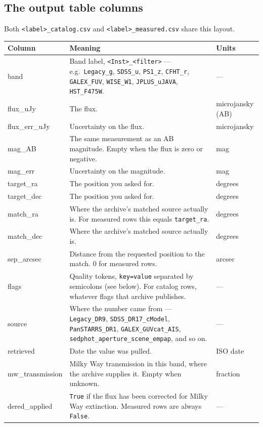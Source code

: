 \documentclass[11pt]{article}
\begin{document}
\subsection{The output table columns}

Both \texttt{<label>\_catalog.csv} and \texttt{<label>\_measured.csv}
share this layout.

\begin{longtable}{T{3.1cm} L{8.1cm} L{3.2cm}}
\toprule
\textbf{\normalfont Column} & \textbf{Meaning} & \textbf{Units} \\
\midrule
\endhead
band & Band label, \texttt{<Inst>\_<filter>} --- e.g.\
  \texttt{Legacy\_g}, \texttt{SDSS\_u}, \texttt{PS1\_z},
  \texttt{CFHT\_r}, \texttt{GALEX\_FUV}, \texttt{WISE\_W1},
  \texttt{JPLUS\_uJAVA}, \texttt{HST\_F475W}. & --- \\[2pt]
flux\_uJy & The flux. & microjansky (AB) \\[2pt]
flux\_err\_uJy & Uncertainty on the flux. & microjansky \\[2pt]
mag\_AB & The same measurement as an AB magnitude. Empty when the flux is
  zero or negative. & mag \\[2pt]
mag\_err & Uncertainty on the magnitude. & mag \\[2pt]
target\_ra & The position you asked for. & degrees \\[2pt]
target\_dec & The position you asked for. & degrees \\[2pt]
match\_ra & Where the archive's matched source actually is. For measured
  rows this equals \texttt{target\_ra}. & degrees \\[2pt]
match\_dec & Where the archive's matched source actually is. & degrees \\[2pt]
sep\_arcsec & Distance from the requested position to the match. 0 for
  measured rows. & arcsec \\[2pt]
flags & Quality tokens, \texttt{key=value} separated by semicolons (see
  below). For catalog rows, whatever flags that archive publishes. &
  --- \\[2pt]
source & Where the number came from --- \texttt{Legacy\_DR9},
  \texttt{SDSS\_DR17\_cModel}, \texttt{PanSTARRS\_DR1},
  \texttt{GALEX\_GUVcat\_AIS}, \texttt{sedphot\_aperture\_scene\_empap},
  and so on. & --- \\[2pt]
retrieved & Date the value was pulled. & ISO date \\[2pt]
mw\_transmission & Milky Way transmission in this band, where the archive
  supplies it. Empty when unknown. & fraction \\[2pt]
dered\_applied & \texttt{True} if the flux has been corrected for Milky
  Way extinction. Measured rows are always \texttt{False}. & --- \\
\bottomrule
\end{longtable}
\end{document}
